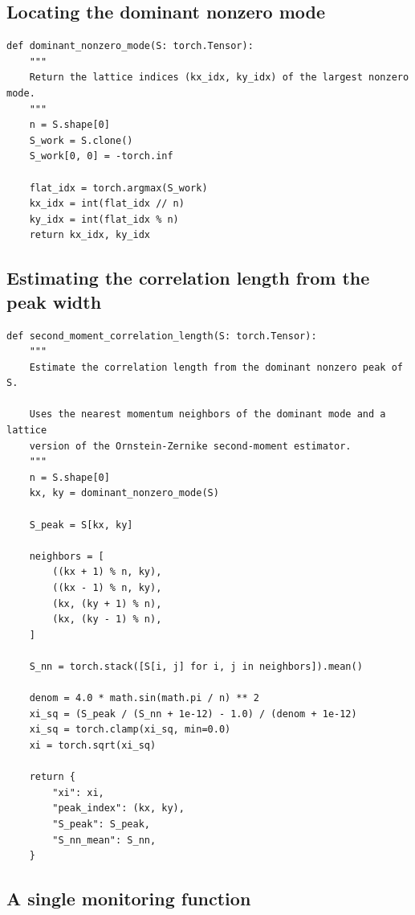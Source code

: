 \documentclass[11pt]{article}
\begin{document}
\subsection{Locating the dominant nonzero mode}

\begin{lstlisting}[style=pythonstyle]
def dominant_nonzero_mode(S: torch.Tensor):
    """
    Return the lattice indices (kx_idx, ky_idx) of the largest nonzero mode.
    """
    n = S.shape[0]
    S_work = S.clone()
    S_work[0, 0] = -torch.inf

    flat_idx = torch.argmax(S_work)
    kx_idx = int(flat_idx // n)
    ky_idx = int(flat_idx % n)
    return kx_idx, ky_idx
\end{lstlisting}

\subsection{Estimating the correlation length from the peak width}

\begin{lstlisting}[style=pythonstyle]
def second_moment_correlation_length(S: torch.Tensor):
    """
    Estimate the correlation length from the dominant nonzero peak of S.

    Uses the nearest momentum neighbors of the dominant mode and a lattice
    version of the Ornstein-Zernike second-moment estimator.
    """
    n = S.shape[0]
    kx, ky = dominant_nonzero_mode(S)

    S_peak = S[kx, ky]

    neighbors = [
        ((kx + 1) % n, ky),
        ((kx - 1) % n, ky),
        (kx, (ky + 1) % n),
        (kx, (ky - 1) % n),
    ]

    S_nn = torch.stack([S[i, j] for i, j in neighbors]).mean()

    denom = 4.0 * math.sin(math.pi / n) ** 2
    xi_sq = (S_peak / (S_nn + 1e-12) - 1.0) / (denom + 1e-12)
    xi_sq = torch.clamp(xi_sq, min=0.0)
    xi = torch.sqrt(xi_sq)

    return {
        "xi": xi,
        "peak_index": (kx, ky),
        "S_peak": S_peak,
        "S_nn_mean": S_nn,
    }
\end{lstlisting}

\subsection{A single monitoring function}
\end{document}

